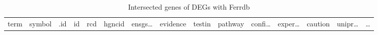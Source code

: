 \documentclass[
]{article}
\begin{document}
\begin{longtable}[]{@{}lllllllllllllll@{}}
\caption{\label{tab:intersected-genes-of-DEGs-with-Ferrdb}Intersected genes of DEGs with Ferrdb}\tabularnewline
\toprule
\begin{minipage}[b]{0.05\columnwidth}\raggedright
term\strut
\end{minipage} & \begin{minipage}[b]{0.05\columnwidth}\raggedright
symbol\strut
\end{minipage} & \begin{minipage}[b]{0.04\columnwidth}\raggedright
.id\strut
\end{minipage} & \begin{minipage}[b]{0.02\columnwidth}\raggedright
id\strut
\end{minipage} & \begin{minipage}[b]{0.05\columnwidth}\raggedright
rcd\strut
\end{minipage} & \begin{minipage}[b]{0.05\columnwidth}\raggedright
hgncid\strut
\end{minipage} & \begin{minipage}[b]{0.05\columnwidth}\raggedright
ensgs\ldots{}\strut
\end{minipage} & \begin{minipage}[b]{0.05\columnwidth}\raggedright
evidence\strut
\end{minipage} & \begin{minipage}[b]{0.05\columnwidth}\raggedright
testin\strut
\end{minipage} & \begin{minipage}[b]{0.05\columnwidth}\raggedright
pathway\strut
\end{minipage} & \begin{minipage}[b]{0.05\columnwidth}\raggedright
confi\ldots{}\strut
\end{minipage} & \begin{minipage}[b]{0.05\columnwidth}\raggedright
exper\ldots{}\strut
\end{minipage} & \begin{minipage}[b]{0.05\columnwidth}\raggedright
caution\strut
\end{minipage} & \begin{minipage}[b]{0.05\columnwidth}\raggedright
unipr\ldots{}\strut
\end{minipage} & \begin{minipage}[b]{0.02\columnwidth}\raggedright
\ldots{}\strut
\end{minipage}\tabularnewline

\end{longtable}
\end{document}
